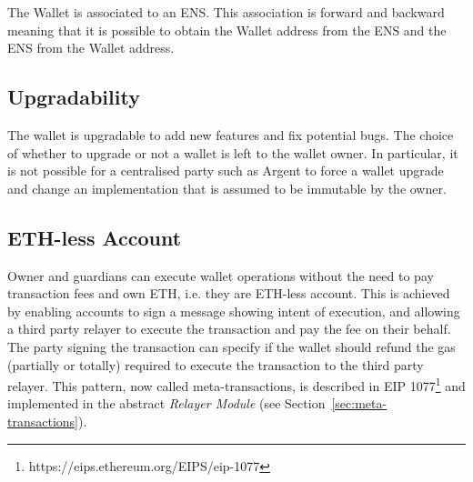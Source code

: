 \documentclass[12pt]{article}
\begin{document}
The Wallet is associated to an ENS. This association is forward and backward meaning that it is possible to obtain the Wallet address from the ENS and the ENS from the Wallet address.

\subsection{Upgradability}

The wallet is upgradable to add new features and fix potential bugs. The choice of whether to upgrade or not a wallet is left to the wallet owner. In particular, it is not possible for a centralised party such as Argent to force a wallet upgrade and change an implementation that is assumed to be immutable by the owner.

\subsection{ETH-less Account}
\label{sec:eth-less-account}

Owner and guardians can execute wallet operations without the need to pay transaction fees and own ETH, i.e. they are ETH-less account. This is achieved by enabling accounts to sign a message showing intent of execution, and allowing a third party relayer to execute the transaction and pay the fee on their behalf. The party signing the transaction can specify if the wallet should refund the gas (partially or totally) required to execute the transaction to the third party relayer. This pattern, now called meta-transactions, is described in EIP 1077\footnote{https://eips.ethereum.org/EIPS/eip-1077} and implemented in the abstract \emph{Relayer Module} (see Section~\ref{sec:meta-transactions}). 

\end{document}
